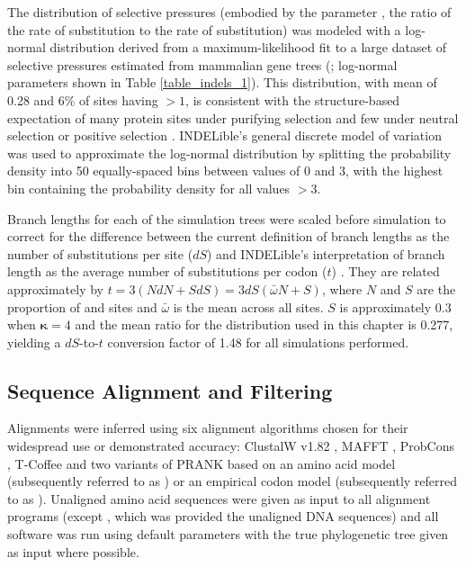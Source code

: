 The distribution of \sw selective pressures (embodied by the parameter
\omg, the ratio of the rate of \nsyn substitution to the
rate of \syn substitution) was modeled with a log-normal
distribution derived from a maximum-likelihood fit to a large dataset
of \sw selective pressures estimated from mammalian gene trees
(\citet{LindbladToh2011}; log-normal parameters shown in Table
\ref{table_indels_1}). This distribution, with mean \omg of 0.28 and 6\% of
sites having \omg$>1$, is consistent with the structure-based
expectation of many protein sites under purifying selection and few
under neutral selection or positive selection
\citep{Smith1970Natural,Kimura1974}. INDELible's general
discrete model of \sw \omg variation was used to approximate the
log-normal distribution by splitting the probability density into 50
equally-spaced bins between \omg values of 0 and 3, with the highest
bin containing the probability density for all values \omg$>3$.

Branch lengths for each of the simulation trees were scaled before
simulation to correct for the difference between the current definition of
branch lengths as the number of \syn substitutions per
\syn site ($dS$) and INDELible's interpretation of branch length
as the average number of substitutions per codon ($t$)
\citep{Fletcher2010}. They are related approximately by
$t=3(NdN+SdS) = 3dS(\bar{\omega}N+S)$, where $N$ and $S$ are the
proportion of \nsyn and \syn sites and $\bar{\omega}$ is
the mean \omg across all sites. $S$ is approximately 0.3 when
$\bm{\kappa}=4$ \citep{Yang1998a} and the mean \omg ratio
for the distribution used in this chapter is 0.277, yielding a $dS$-to-$t$
conversion factor of 1.48 for all simulations performed.

\subsection{Sequence Alignment and Filtering}

Alignments were inferred using six alignment algorithms chosen for
their widespread use or demonstrated accuracy: ClustalW v1.82
\citep{Thompson1994ClustalW}, MAFFT \citep{Katoh2005}, ProbCons
\citep{Do2005a}, T-Coffee \citep{Notredame2000} and two variants of
PRANK \citep{Loytynoja2008PhylogenyAware} based on an amino acid model
(subsequently referred to as \pranka{}) or an empirical codon model
(subsequently referred to as \prankc{}). Unaligned amino acid
sequences were given as input to all alignment programs (except
\prankc{}, which was provided the unaligned DNA sequences) and all
software was run using default parameters with the true phylogenetic
tree given as input where possible.

